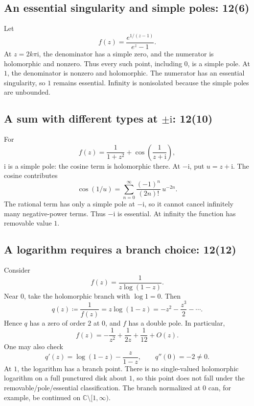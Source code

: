 \documentclass[11pt,a4paper]{article}
\theoremstyle{definition}
\theoremstyle{plain}
\newcommand{\C}{\mathbb{C}}
\begin{document}
\subsection{An essential singularity and simple poles: 12(6)}
Let
\begin{equation}\label{eq:18}
f(z)=\frac{e^{1/(z-1)}}{e^z-1}.
\end{equation}
At $z=2k\pi \mathrm{i}$, the denominator has a simple zero, and the numerator
is holomorphic and nonzero. Thus every such point, including $0$, is a
simple pole. At $1$, the denominator is nonzero and holomorphic.
The numerator has an essential singularity, so $1$ remains essential.
Infinity is nonisolated because the simple poles are unbounded.

\subsection{A sum with different types at \texorpdfstring{$\pm \mathrm{i}$}{+i and -i}: 12(10)}
For
\begin{equation}\label{eq:19}
f(z)=\frac1{1+z^2}+\cos\left(\frac1{z+\mathrm{i}}\right),
\end{equation}
$\mathrm{i}$ is a simple pole: the cosine term is holomorphic there.
At $-\mathrm{i}$, put $u=z+\mathrm{i}$. The cosine contributes
\begin{equation}\label{eq:20}
\cos(1/u)=\sum_{n=0}^{\infty}\frac{(-1)^n}{(2n)!}\,u^{-2n}.
\end{equation}
The rational term has only a simple pole at $-\mathrm{i}$, so it cannot cancel
infinitely many negative-power terms. Thus $-\mathrm{i}$ is essential.
At infinity the function has removable value $1$.

\subsection{A logarithm requires a branch choice: 12(12)}
Consider
\begin{equation}\label{eq:21}
f(z)=\frac1{z\log(1-z)}.
\end{equation}
Near $0$, take the holomorphic branch with $\log1=0$. Then
\begin{equation}\label{eq:22}
q(z)\coloneqq \frac1{f(z)}
      =z\log(1-z)=-z^2-\frac{z^3}{2}-\cdots .
\end{equation}
Hence $q$ has a zero of order $2$ at $0$, and $f$ has a double pole.
In particular,
\begin{equation}\label{eq:23}
f(z)=-\frac1{z^2}+\frac1{2z}+\frac1{12}+O(z).
\end{equation}
One may also check
\begin{equation}\label{eq:24}
q'(z)=\log(1-z)-\frac z{1-z},\qquad q''(0)=-2\neq0.
\end{equation}
At $1$, the logarithm has a branch point. There is no single-valued
holomorphic logarithm on a full punctured disk about $1$, so this point
does not fall under the removable/pole/essential classification.
The branch normalized at $0$ can, for example, be continued on
$\C\setminus[1,\infty)$.
\end{document}
